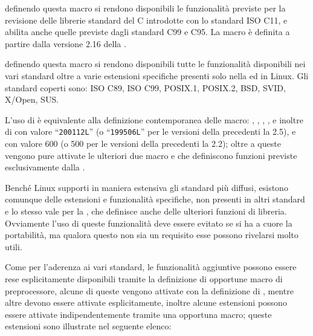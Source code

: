 \begin{basedescript}{\desclabelwidth{2.7cm}\desclabelstyle{\nextlinelabel}}
\item[\macrod{\_ISOC11\_SOURCE}] definendo questa macro si rendono disponibili
  le funzionalità previste per la revisione delle librerie standard del C
  introdotte con lo standard ISO C11, e abilita anche quelle previste dagli
  standard C99 e C95. La macro è definita a partire dalla versione 2.16 della
  .

\item[\macrod{\_GNU\_SOURCE}] definendo questa macro si rendono disponibili
  tutte le funzionalità disponibili nei vari standard oltre a varie estensioni
  specifiche presenti solo nella  ed in Linux. Gli standard coperti
  sono: ISO C89, ISO C99, POSIX.1, POSIX.2, BSD, SVID, X/Open, SUS.

  L'uso di  è equivalente alla definizione contemporanea
  delle macro: , ,
  , , e inoltre di
   con valore ``\texttt{200112L}'' (o
  ``\texttt{199506L}'' per le versioni della  precedenti la 2.5),
   e  con valore 600
  (o 500 per le versioni della  precedenti la 2.2); oltre a queste
  vengono pure attivate le ulteriori due macro  e
   che definiscono funzioni previste
  esclusivamente dalla .
 
\end{basedescript}

Benché Linux supporti in maniera estensiva gli standard più diffusi, esistono
comunque delle estensioni e funzionalità specifiche, non presenti in altri
standard e lo stesso vale per la , che definisce anche delle
ulteriori funzioni di libreria. Ovviamente l'uso di queste funzionalità deve
essere evitato se si ha a cuore la portabilità, ma qualora questo non sia un
requisito esse possono rivelarsi molto utili.

Come per l'aderenza ai vari standard, le funzionalità aggiuntive possono
essere rese esplicitamente disponibili tramite la definizione di opportune
macro di preprocessore, alcune di queste vengono attivate con la definizione
di , mentre altre devono essere attivate esplicitamente,
inoltre alcune estensioni possono essere attivate indipendentemente tramite
una opportuna macro; queste estensioni sono illustrate nel seguente elenco:

